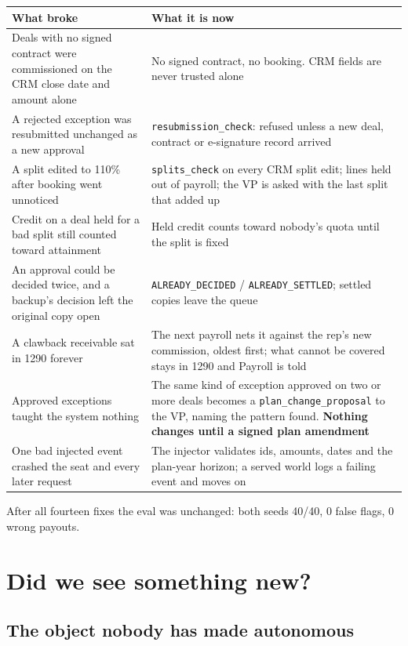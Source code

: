 \documentclass[10pt,a4paper]{article}
\newcommand{\code}[1]{{\small\texttt{#1}}}
\begin{document}
\begin{tabularx}{\textwidth}{@{}p{72mm}X@{}}
\toprule
\textbf{What broke} & \textbf{What it is now}\\
\midrule
Deals with no signed contract were commissioned on the CRM close date and amount alone & No signed contract, no booking. CRM fields are never trusted alone\\
A rejected exception was resubmitted unchanged as a new approval & \code{resubmission\_check}: refused unless a new deal, contract or e-signature record arrived\\
A split edited to 110\% after booking went unnoticed & \code{splits\_check} on every CRM split edit; lines held out of payroll; the VP is asked with the last split that added up\\
Credit on a deal held for a bad split still counted toward attainment & Held credit counts toward nobody's quota until the split is fixed\\
An approval could be decided twice, and a backup's decision left the original copy open & \code{ALREADY\_DECIDED} / \code{ALREADY\_SETTLED}; settled copies leave the queue\\
A clawback receivable sat in 1290 forever & The next payroll nets it against the rep's new commission, oldest first; what cannot be covered stays in 1290 and Payroll is told\\
Approved exceptions taught the system nothing & The same kind of exception approved on two or more deals becomes a \code{plan\_change\_proposal} to the VP, naming the pattern found. \textbf{Nothing changes until a signed plan amendment}\\
One bad injected event crashed the seat and every later request & The injector validates ids, amounts, dates and the plan-year horizon; a served world logs a failing event and moves on\\
\bottomrule
\end{tabularx}

\vspace{4pt}
After all fourteen fixes the eval was unchanged: both seeds 40/40, 0 false flags, 0 wrong payouts.

\section{Did we see something new?}

\subsection{The object nobody has made autonomous}
\end{document}
